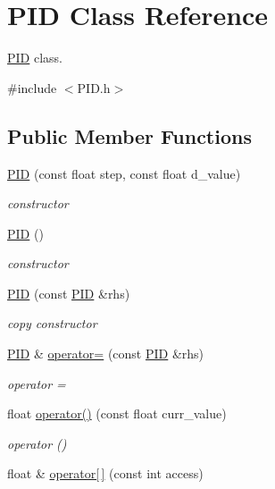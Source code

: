 \hypertarget{classPID}{}\section{P\+ID Class Reference}
\label{classPID}


\hyperlink{classPID}{P\+ID} class.  




{\ttfamily \#include $<$P\+I\+D.\+h$>$}

\subsection*{Public Member Functions}
\begin{DoxyCompactItemize}
\item 
\hyperlink{classPID_a8aba942356f95f82b69f9355411255a8}{P\+ID} (const float step, const float d\+\_\+value)
\begin{DoxyCompactList}\small\item\em constructor \end{DoxyCompactList}\item 
\hyperlink{classPID_a0311b6f7de348499ce24e53ba353514a}{P\+ID} ()
\begin{DoxyCompactList}\small\item\em constructor \end{DoxyCompactList}\item 
\hyperlink{classPID_a41a7366e29da45f548e541952d13e553}{P\+ID} (const \hyperlink{classPID}{P\+ID} \&rhs)
\begin{DoxyCompactList}\small\item\em copy constructor \end{DoxyCompactList}\item 
\hyperlink{classPID}{P\+ID} \& \hyperlink{classPID_ac29f152d7dd94fa8d6af144c070a553b}{operator=} (const \hyperlink{classPID}{P\+ID} \&rhs)
\begin{DoxyCompactList}\small\item\em operator = \end{DoxyCompactList}\item 
float \hyperlink{classPID_adb9d986a6d94b9e717c2b8f557cdd59c}{operator()} (const float curr\+\_\+value)
\begin{DoxyCompactList}\small\item\em operator () \end{DoxyCompactList}\item 
float \& \hyperlink{classPID_a1994e0891dc1054a4ba99be45bce68c0}{operator\mbox{[}$\,$\mbox{]}} (const int access)

\end{DoxyCompactItemize}
